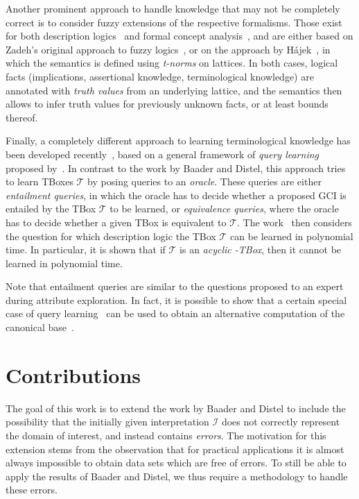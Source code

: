 Another prominent approach to handle knowledge that may not be completely correct is to
consider fuzzy extensions of the respective formalisms.  Those exist for both description
logics~\cite{journals/fss/BobilloS09,journals/ws/LukasiewiczS08} and formal concept
analysis~\cite{Pollandt97b,conf/cla/BelohlavekV05}, and are either based on Zadeh's
original approach to fuzzy logics~\cite{journals/iandc/Zadeh65}, or on the approach by
Hájek~\cite{hajek1998metamathematics}, in which the semantics is defined using
\emph{t-norms} on lattices.  In both cases, logical facts (implications, assertional
knowledge, terminological knowledge) are annotated with \emph{truth values} from an
underlying lattice, and the semantics then allows to infer truth values for previously
unknown facts, or at least bounds thereof.

Finally, a completely different approach to learning terminological knowledge has been
developed recently~\cite{conf/dlog/KonevLW13}, based on a general framework of \emph{query
  learning} proposed by~\cite{journals/ml/Angluin87}.  In contrast to the work by Baader
and Distel, this approach tries to learn TBoxes $\mathcal{T}$ by posing queries to an
\emph{oracle}.  These queries are either \emph{entailment queries}, in which the oracle
has to decide whether a proposed GCI is entailed by the TBox $\mathcal{T}$ to be learned,
or \emph{equivalence queries}, where the oracle has to decide whether a given TBox is
equivalent to $\mathcal{T}$.  The work~\cite{conf/dlog/KonevLW13} then considers
the question for which description logic the TBox $\mathcal{T}$ can be learned in
polynomial time.  In particular, it is shown that if $\mathcal{T}$ is an \emph{acyclic
  \EL-TBox}, then it cannot be learned in polynomial time.

Note that entailment queries are similar to the questions proposed to an expert during
attribute exploration.  In fact, it is possible to show that a certain special case of
query learning~\cite{journals/ml/AngluinFP92} can be used to obtain an alternative
computation of the canonical base~\cite{journals/ml/AriasB11}.

\section{Contributions}
\label{sec:contributions}

The goal of this work is to extend the work by Baader and Distel to include the
possibility that the initially given interpretation $\mathcal{I}$ does not correctly
represent the domain of interest, and instead contains \emph{errors}.  The motivation for
this extension stems from the observation that for practical applications it is almost
always impossible to obtain data sets which are free of errors.  To still be able to apply
the results of Baader and Distel, we thus require a methodology to handle these errors.

